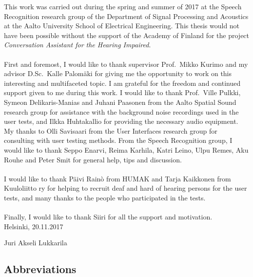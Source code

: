 \documentclass[english, 12pt, a4paper, pdftex, elec, utf8]{aaltothesis}
\begin{document}
This work was carried out during the spring and summer of 2017 at the Speech Recognition research group of the Department of Signal Processing and Acoustics at the Aalto University School of Electrical Engineering. This thesis would not have been possible without the support of the Academy of Finland for the project \textit{Conversation Assistant for the Hearing Impaired}. \\\\
First and foremost, I would like to thank supervisor Prof.\ Mikko Kurimo and my advisor D.Sc.\ Kalle Palomäki for giving me the opportunity to work on this interesting and multifaceted topic. I am grateful for the freedom and continued support given to me during this work. I would like to thank Prof.\ Ville Pulkki, Symeon Delikaris-Manias and Juhani Paasonen from the Aalto Spatial Sound research group for assistance with the background noise recordings used in the user tests, and Ilkka Huhtakallio for providing the necessary audio equipment. My thanks to Olli Savisaari from the User Interfaces research group for consulting with user testing methods. From the Speech Recognition group, I would like to thank Seppo Enarvi, Reima Karhila, Katri Leino, Ulpu Remes, Aku Rouhe and Peter Smit for general help, tips and discussion. \\\\
I would like to thank Päivi Rainò from HUMAK and Tarja Kaikkonen from Kuuloliitto ry for helping to recruit deaf and hard of hearing persons for the user tests, and many thanks to the people who participated in the tests. \\\\
Finally, I would like to thank Siiri for all the support and motivation. \\

\vspace{1cm}
\noindent Helsinki, 20.11.2017

\vspace{2mm}
\noindent Juri Akseli Lukkarila

\newpage

\thesistableofcontents


\subsection*{Abbreviations}
\end{document}
